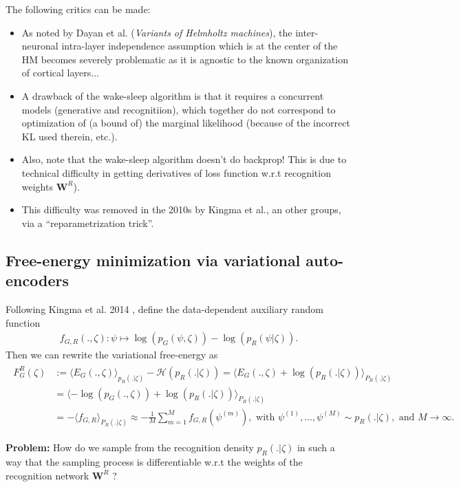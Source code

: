 \documentclass{article} %
\def\W{\mathbf{W}}
\begin{document}
The following critics can be made:
\begin{itemize}
  \item 
    As noted by Dayan et al. (\textit{Variants of Helmholtz machines}), the inter-neuronal intra-layer independence assumption which is at the center of the HM becomes severely problematic as it is agnostic to the known organization of cortical layers...
  \item A drawback of the wake-sleep algorithm is that it requires a concurrent models (generative and recognitiion), which together do not correspond to optimization of (a bound of) the marginal likelihood (because of the incorrect KL used therein, etc.).
  \item Also, note that the wake-sleep algorithm doesn't do backprop! This is due to
    technical difficulty in getting derivatives of loss function w.r.t
    recognition weights $\W^R$).
  \item This difficulty was removed in the 2010s by Kingma et al., an other groups, via a ``reparametrization trick''.
    \end{itemize}


\subsection{Free-energy minimization via variational auto-encoders}
Following Kingma et al. 2014 \cite{kingma2013auto}, define the data-dependent auxiliary random function
\begin{eqnarray}
  f_{G,R}(., \zeta) :\psi \mapsto \log(p_G(\psi,\zeta)) - \log(p_R(\psi|\zeta)).
\end{eqnarray}
Then we can rewrite the
variational free-energy as
\begin{eqnarray*}
  \begin{split}
    F_G^R(\zeta) &:= \langle E_G(., \zeta) \rangle_{p_R(. |\zeta)} - \mathcal H(p_R(. |\zeta)) = \langle E_G(., \zeta) + \log(p_R(.|\zeta))\rangle_{P_R(.|\zeta)}\\
    &=\langle -\log(p_G(.,\zeta)) + \log(p_R(.|\zeta))\rangle_{P_R(.|\zeta)}\\
    &= -\langle f_{G,R}\rangle_{P_R(.|\zeta)} \approx -\frac{1}{M}\sum_{m=1}^Mf_{G,R}(\psi^{(m)}), \text{ with }\psi^{(1)},\ldots,\psi^{(M)} \sim p_R(.|\zeta), \text{ and }M \rightarrow \infty.
    \end{split}
\end{eqnarray*}

\begin{mdframed}
  \textbf{Problem:} How do we sample from the recognition density $p_R(.|\zeta)$ in such a way that the sampling process is differentiable w.r.t the weights of the recognition network $\W^R$ ?
\end{mdframed}
\end{document}
